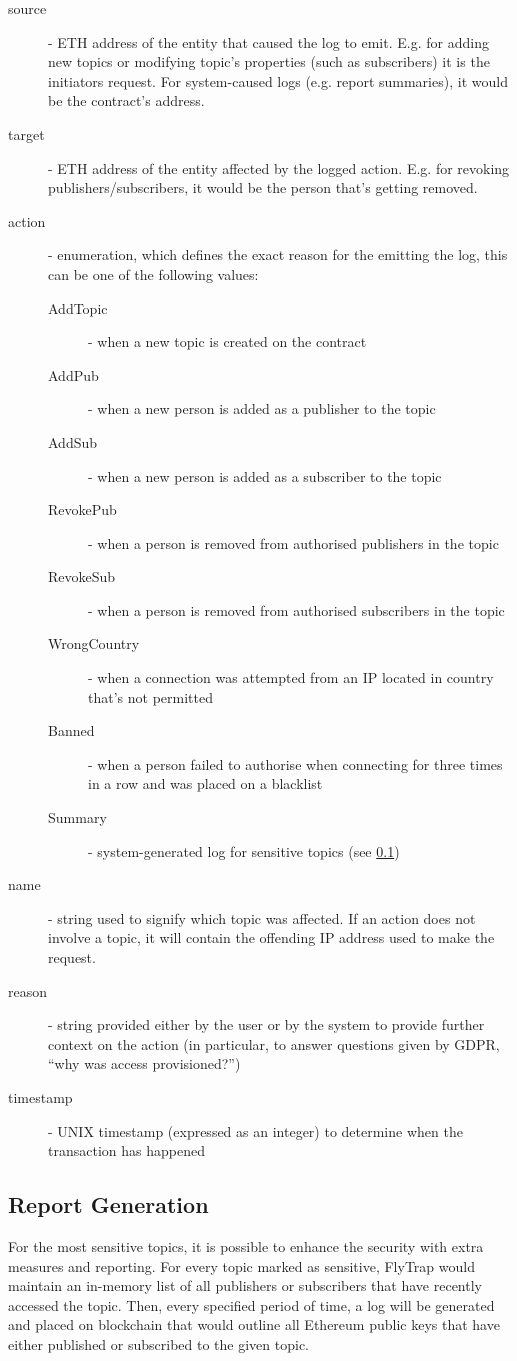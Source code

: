 \begin{description}
    \item[source] - ETH address of the entity that caused the log to emit. E.g. for adding new topics or modifying topic's properties (such as subscribers) it is the initiators request. For system-caused logs (e.g. report summaries), it would be the contract's address.
    \item[target] - ETH address of the entity affected by the logged action. E.g. for revoking publishers/subscribers, it would be the person that's getting removed.
    \item[action] - enumeration, which defines the exact reason for the emitting the log, this can be one of the following values:
    \begin{description}
        \item[AddTopic] - when a new topic is created on the contract
        \item[AddPub] - when a new person is added as a publisher to the topic
        \item[AddSub] - when a new person is added as a subscriber to the topic
        \item[RevokePub] - when a person is removed from authorised publishers in the topic
        \item[RevokeSub] - when a person is removed from authorised subscribers in the topic
        \item[WrongCountry] - when a connection was attempted from an IP located in country that's not permitted
        \item[Banned] - when a person failed to authorise when connecting for three times in a row and was placed on a blacklist
        \item[Summary] - system-generated log for sensitive topics (see \ref{sec:reports})
    \end{description}
    \item[name] - string used to signify which topic was affected. If an action does not involve a topic, it will contain the offending IP address used to make the request.
    \item[reason] - string provided either by the user or by the system to provide further context on the action (in particular, to answer questions given by GDPR, ``why was access provisioned?'')
    \item[timestamp] - UNIX timestamp (expressed as an integer) to determine when the transaction has happened
\end{description}
\subsection{Report Generation}\label{sec:reports}
For the most sensitive topics, it is possible to enhance the security with extra measures and reporting. For every topic marked as sensitive, FlyTrap would maintain an in-memory list of all publishers or subscribers that have recently accessed the topic. Then, every specified period of time, a log will be generated and placed on blockchain that would outline all Ethereum public keys that have either published or subscribed to the given topic.

